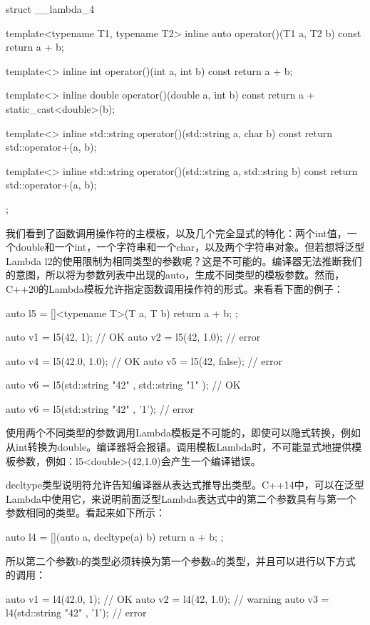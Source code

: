 \begin{cpp}
struct __lambda_4
{
	template<typename T1, typename T2>
	inline auto operator()(T1 a, T2 b) const
	{
		return a + b;
	}

	template<>
	inline int operator()(int a, int b) const
	{
		return a + b;
	}

	template<>
	inline double operator()(double a, int b) const
	{
		return a + static_cast<double>(b);
	}

	template<>
	inline std::string operator()(std::string a,
	char b) const
	{
		return std::operator+(a, b);
	}

	template<>
	inline std::string operator()(std::string a,
	std::string b) const
	{
		return std::operator+(a, b);
	}
};
\end{cpp}

我们看到了函数调用操作符的主模板，以及几个完全显式的特化：两个int值，一个double和一个int，一个字符串和一个char，以及两个字符串对象。但若想将泛型Lambda l2的使用限制为相同类型的参数呢？这是不可能的。编译器无法推断我们的意图，所以将为参数列表中出现的auto，生成不同类型的模板参数。然而，C++20的Lambda模板允许指定函数调用操作符的形式。来看看下面的例子：

\begin{cpp}
auto l5 = []<typename T>(T a, T b) { return a + b; };

auto v1 = l5(42, 1); // OK
auto v2 = l5(42, 1.0); // error

auto v4 = l5(42.0, 1.0); // OK
auto v5 = l5(42, false); // error

auto v6 = l5(std::string{ "42" }, std::string{ "1" }); // OK

auto v6 = l5(std::string{ "42" }, '1'); // error
\end{cpp}

使用两个不同类型的参数调用Lambda模板是不可能的，即使可以隐式转换，例如从int转换为double。编译器将会报错。调用模板Lambda时，不可能显式地提供模板参数，例如：l5<double>(42,1.0)会产生一个编译错误。

decltype类型说明符允许告知编译器从表达式推导出类型。C++14中，可以在泛型Lambda中使用它，来说明前面泛型Lambda表达式中的第二个参数具有与第一个参数相同的类型。看起来如下所示：

\begin{cpp}
auto l4 = [](auto a, decltype(a) b) {return a + b; };
\end{cpp}

所以第二个参数b的类型必须转换为第一个参数a的类型，并且可以进行以下方式的调用：

\begin{cpp}
auto v1 = l4(42.0, 1); // OK
auto v2 = l4(42, 1.0); // warning
auto v3 = l4(std::string{ "42" }, '1'); // error
\end{cpp}

